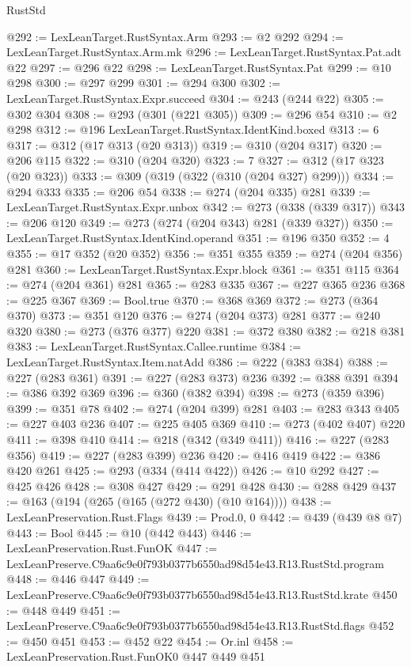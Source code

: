 \begin{lexlean}{RustStd}
\begin{coremodule}
@292 := LexLeanTarget.RustSyntax.Arm
@293 := @2 @292
@294 := LexLeanTarget.RustSyntax.Arm.mk
@296 := LexLeanTarget.RustSyntax.Pat.adt @22
@297 := @296 @22
@298 := LexLeanTarget.RustSyntax.Pat
@299 := @10 @298
@300 := @297 @299
@301 := @294 @300
@302 := LexLeanTarget.RustSyntax.Expr.succeed
@304 := @243 (@244 @22)
@305 := @302 @304
@308 := @293 (@301 (@221 @305))
@309 := @296 @54
@310 := @2 @298
@312 := @196 LexLeanTarget.RustSyntax.IdentKind.boxed
@313 := 6
@317 := @312 (@17 @313 (@20 @313))
@319 := @310 (@204 @317)
@320 := @206 @115
@322 := @310 (@204 @320)
@323 := 7
@327 := @312 (@17 @323 (@20 @323))
@333 := @309 (@319 (@322 (@310 (@204 @327) @299)))
@334 := @294 @333
@335 := @206 @54
@338 := @274 (@204 @335) @281
@339 := LexLeanTarget.RustSyntax.Expr.unbox
@342 := @273 (@338 (@339 @317))
@343 := @206 @120
@349 := @273 (@274 (@204 @343) @281 (@339 @327))
@350 := LexLeanTarget.RustSyntax.IdentKind.operand
@351 := @196 @350
@352 := 4
@355 := @17 @352 (@20 @352)
@356 := @351 @355
@359 := @274 (@204 @356) @281
@360 := LexLeanTarget.RustSyntax.Expr.block
@361 := @351 @115
@364 := @274 (@204 @361) @281
@365 := @283 @335
@367 := @227 @365 @236
@368 := @225 @367
@369 := Bool.true
@370 := @368 @369
@372 := @273 (@364 @370)
@373 := @351 @120
@376 := @274 (@204 @373) @281
@377 := @240 @320
@380 := @273 (@376 @377) @220
@381 := @372 @380
@382 := @218 @381
@383 := LexLeanTarget.RustSyntax.Callee.runtime
@384 := LexLeanTarget.RustSyntax.Item.natAdd
@386 := @222 (@383 @384)
@388 := @227 (@283 @361)
@391 := @227 (@283 @373) @236
@392 := @388 @391
@394 := @386 @392 @369
@396 := @360 (@382 @394)
@398 := @273 (@359 @396)
@399 := @351 @78
@402 := @274 (@204 @399) @281
@403 := @283 @343
@405 := @227 @403 @236
@407 := @225 @405 @369
@410 := @273 (@402 @407) @220
@411 := @398 @410
@414 := @218 (@342 (@349 @411))
@416 := @227 (@283 @356)
@419 := @227 (@283 @399) @236
@420 := @416 @419
@422 := @386 @420 @261
@425 := @293 (@334 (@414 @422))
@426 := @10 @292
@427 := @425 @426
@428 := @308 @427
@429 := @291 @428
@430 := @288 @429
@437 := @163 (@194 (@265 (@165 (@272 @430) (@10 @164))))
@438 := LexLeanPreservation.Rust.Flags
@439 := Prod.{0, 0}
@442 := @439 (@439 @8 @7)
@443 := Bool
@445 := @10 (@442 @443)
@446 := LexLeanPreservation.Rust.FunOK
@447 := LexLeanPreserve.C9aa6c9e0f793b0377b6550ad98d54e43.R13.RustStd.program
@448 := @446 @447
@449 := LexLeanPreserve.C9aa6c9e0f793b0377b6550ad98d54e43.R13.RustStd.krate
@450 := @448 @449
@451 := LexLeanPreserve.C9aa6c9e0f793b0377b6550ad98d54e43.R13.RustStd.flags
@452 := @450 @451
@453 := @452 @22
@454 := Or.inl
@458 := LexLeanPreservation.Rust.FunOK0 @447 @449 @451

\end{coremodule}
\end{lexlean}
